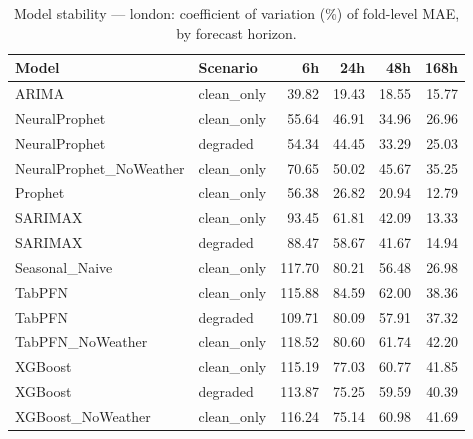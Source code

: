 \begin{table}[h]
\centering
\caption{Model stability — london: coefficient of variation (\%) of fold-level MAE, by forecast horizon.}
\label{tab:stability_london}
\begin{tabular}{llrrrr}
\toprule
Model & Scenario & 6h & 24h & 48h & 168h \\
\midrule
ARIMA & clean\_only & 39.82 & 19.43 & 18.55 & 15.77 \\
NeuralProphet & clean\_only & 55.64 & 46.91 & 34.96 & 26.96 \\
NeuralProphet & degraded & 54.34 & 44.45 & 33.29 & 25.03 \\
NeuralProphet\_NoWeather & clean\_only & 70.65 & 50.02 & 45.67 & 35.25 \\
Prophet & clean\_only & 56.38 & 26.82 & 20.94 & 12.79 \\
SARIMAX & clean\_only & 93.45 & 61.81 & 42.09 & 13.33 \\
SARIMAX & degraded & 88.47 & 58.67 & 41.67 & 14.94 \\
Seasonal\_Naive & clean\_only & 117.70 & 80.21 & 56.48 & 26.98 \\
TabPFN & clean\_only & 115.88 & 84.59 & 62.00 & 38.36 \\
TabPFN & degraded & 109.71 & 80.09 & 57.91 & 37.32 \\
TabPFN\_NoWeather & clean\_only & 118.52 & 80.60 & 61.74 & 42.20 \\
XGBoost & clean\_only & 115.19 & 77.03 & 60.77 & 41.85 \\
XGBoost & degraded & 113.87 & 75.25 & 59.59 & 40.39 \\
XGBoost\_NoWeather & clean\_only & 116.24 & 75.14 & 60.98 & 41.69 \\
\bottomrule
\end{tabular}
\end{table}
